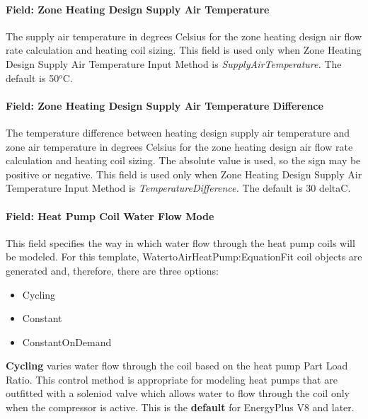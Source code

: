 \paragraph{Field: Zone Heating Design Supply Air Temperature}\label{field-zone-heating-design-supply-air-temperature-2}

The supply air temperature in degrees Celsius for the zone heating design air flow rate calculation and heating coil sizing. This field is used only when Zone Heating Design Supply Air Temperature Input Method is \emph{SupplyAirTemperature.} The default is 50\(^{o}\)C.

\paragraph{Field: Zone Heating Design Supply Air Temperature Difference}\label{field-zone-heating-design-supply-air-temperature-difference-3}

The temperature difference between heating design supply air temperature and zone air temperature in degrees Celsius for the zone heating design air flow rate calculation and heating coil sizing. The absolute value is used, so the sign may be positive or negative. This field is used only when Zone Heating Design Supply Air Temperature Input Method is \emph{TemperatureDifference.} The default is 30 deltaC.

\paragraph{Field: Heat Pump Coil Water Flow Mode}\label{field-heat-pump-coil-water-flow-mode}

This field specifies the way in which water flow through the heat pump coils will be modeled. For this template, WatertoAirHeatPump:EquationFit coil objects are generated and, therefore, there are three options:

\begin{itemize}
\item
  Cycling
\item
  Constant
\item
  ConstantOnDemand
\end{itemize}

\textbf{Cycling} varies water flow through the coil based on the heat pump Part Load Ratio. This control method is appropriate for modeling heat pumps that are outfitted with a soleniod valve which allows water to flow through the coil only when the compressor is active. This is the \textbf{default} for EnergyPlus V8 and later.

